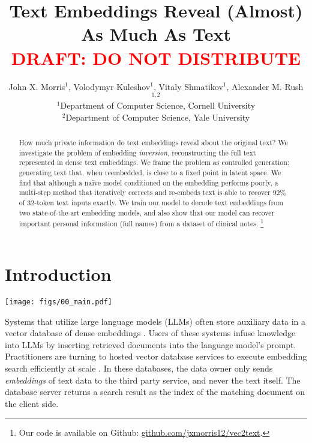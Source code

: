 \documentclass[11pt]{article}
\title{Text Embeddings Reveal (Almost) As Much As Text\\
\textcolor{red}{DRAFT: DO NOT DISTRIBUTE}}
\author{John X. Morris$^1$, Volodymyr Kuleshov$^1$, Vitaly Shmatikov$^1$, Alexander M. Rush$^{1,2}$ \\
$^1$Department of Computer Science, Cornell University \\
$^2$Department of Computer Science, Yale University}
\newcommand{\MethodName}{Vec2Text}
\begin{document}
\maketitle

\begin{abstract}
How much private information do text embeddings reveal about the original text? We investigate the problem of embedding \textit{inversion}, reconstructing the full text represented in dense text embeddings. We frame the problem as controlled generation: generating text that, when reembedded, is close to a fixed point in latent space. We find that although a na\"ive model conditioned on the embedding performs poorly, a multi-step method that iteratively corrects and re-embeds text is able to recover $92\%$ of $32\text{-token}$ text inputs exactly. We train our model to decode text embeddings from two state-of-the-art embedding models, and also show that our model can recover important personal information (full names) from a dataset of clinical notes. \footnote{Our code is available on Github: \href{https://github.com/jxmorris12/vec2text}{github.com/jxmorris12/vec2text}.}
\end{abstract}

\section{Introduction}

\begin{figure*}[t]
    \centering
    \texttt{[image: figs/00\_main.pdf]}
    \caption{Overview of our method, \MethodName. Given access to a target embedding $e$ (blue) and query access to an embedding model $\phi$ (blue model), the system aims to iteratively generate (yellow model) hypotheses $\hat{e}$ (pink) to reach the target. Example input is a taken from a recent Wikipedia article (June 2023). \MethodName\ perfectly recovers this text from its embedding after $4$ rounds of correction.}
    \label{fig:00_main}
\end{figure*}

Systems that utilize large language models (LLMs) often store auxiliary data in a vector database of dense embeddings \cite{borgeaud2022improving, yao2023react}. Users of these systems infuse knowledge into LLMs by inserting retrieved documents into the language model's prompt. Practitioners are turning to hosted vector  database services to execute embedding search efficiently at scale \cite{vdb1Pinecone,vdb2qdrant,vdb3vdaas,vdb4weaviate,harrison2023langchain}.
In these databases, the data owner only sends \textit{embeddings} of text data \cite{le2014distributed,kiros2015skipthought} to the third party service, and never the text itself. The database server returns a search result as the index of the matching document on the client side.
\end{document}
